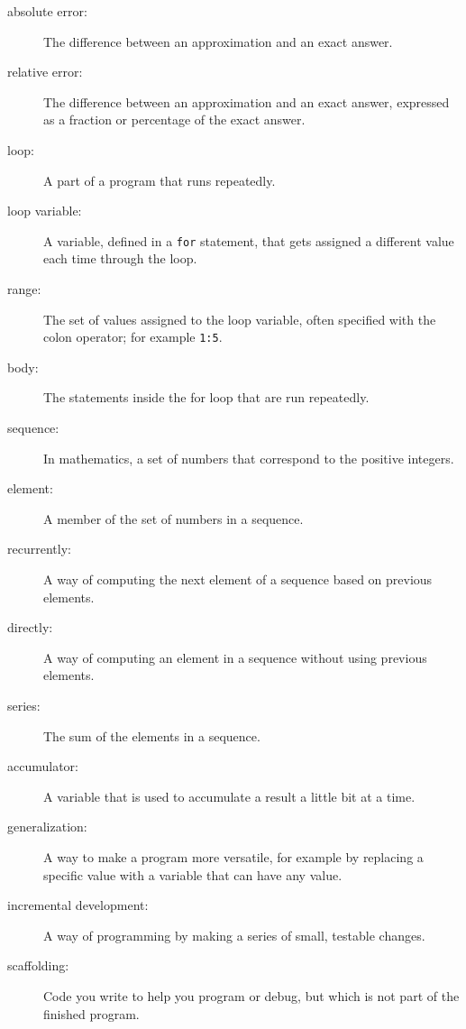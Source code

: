 \documentclass[
]{book}
\numberwithin{Answer}{chapter}
\numberwithin{Exercise}{chapter}
\begin{document}
\begin{description}

\item[absolute error:] The difference between an approximation and
an exact answer.

\item[relative error:] The difference between an approximation and
an exact answer, expressed as a fraction or percentage of the exact
answer.

\item[loop:] A part of a program that runs repeatedly.

\item[loop variable:] A variable, defined in a {\tt for} statement,
that gets assigned a different value each time through the loop.

\item[range:] The set of values assigned to the loop variable, often
specified with the colon operator; for example {\tt 1:5}.

\item[body:] The statements inside the for loop that are run
repeatedly.

\item[sequence:] In mathematics, a set of numbers that correspond
to the positive integers.

\item[element:] A member of the set of numbers in a sequence.

\item[recurrently:] A way of computing the next element of a sequence
based on previous elements.

\item[directly:] A way of computing an element in a sequence without
using previous elements.

\item[series:] The sum of the elements in a sequence.

\item[accumulator:] A variable that is used to accumulate a result
a little bit at a time.

\item[generalization:] A way to make a program more versatile, for
example by replacing a specific value with a variable that can have
any value.

\item[incremental development:] A way of programming by making a series
of small, testable changes.

\item[scaffolding:] Code you write to help you program or debug, but
which is not part of the finished program.

\end{description}
\end{document}
